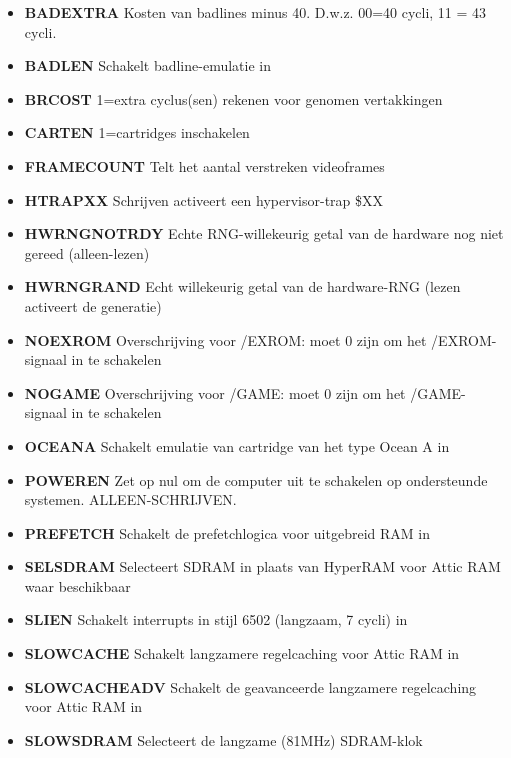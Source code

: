 \begin{itemize}
\item{\bf{BADEXTRA}} Kosten van badlines minus 40. D.w.z. 00=40 cycli, 11 = 43 cycli.
\item{\bf{BADLEN}} Schakelt badline-emulatie in
\item{\bf{BRCOST}} 1=extra cyclus(sen) rekenen voor genomen vertakkingen
\item{\bf{CARTEN}} 1=cartridges inschakelen
\item{\bf{FRAMECOUNT}} Telt het aantal verstreken videoframes
\item{\bf{HTRAPXX}} Schrijven activeert een hypervisor-trap \$XX
\item{\bf{HWRNGNOTRDY}} Echte RNG-willekeurig getal van de hardware nog niet gereed (alleen-lezen)
\item{\bf{HWRNGRAND}} Echt willekeurig getal van de hardware-RNG (lezen activeert de generatie)
\item{\bf{NOEXROM}} Overschrijving voor /EXROM: moet 0 zijn om het /EXROM-signaal in te schakelen
\item{\bf{NOGAME}} Overschrijving voor /GAME: moet 0 zijn om het /GAME-signaal in te schakelen
\item{\bf{OCEANA}} Schakelt emulatie van cartridge van het type Ocean A in
\item{\bf{POWEREN}} Zet op nul om de computer uit te schakelen op ondersteunde systemen. ALLEEN-SCHRIJVEN.
\item{\bf{PREFETCH}} Schakelt de prefetchlogica voor uitgebreid RAM in
\item{\bf{SELSDRAM}} Selecteert SDRAM in plaats van HyperRAM voor Attic RAM waar beschikbaar
\item{\bf{SLIEN}} Schakelt interrupts in stijl 6502 (langzaam, 7 cycli) in
\item{\bf{SLOWCACHE}} Schakelt langzamere regelcaching voor Attic RAM in
\item{\bf{SLOWCACHEADV}} Schakelt de geavanceerde langzamere regelcaching voor Attic RAM in
\item{\bf{SLOWSDRAM}} Selecteert de langzame (81MHz) SDRAM-klok
\end{itemize}
